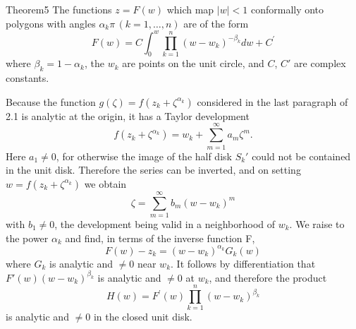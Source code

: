 \begin{originalstatement}{Theorem}{5}\label{thm:6.5}
The functions $z = F(w)$ which map $|w| < 1$ conformally onto polygons with angles $\alpha_k\pi\,(k = 1, \ldots, n)$ are of the form
\begin{equation*}
F (w) = C \int_ {0} ^ {w} \prod_ {k = 1} ^ {n} (w - w _ {k}) ^ {- \beta_ {k}} d w + C ^ {\prime}\tag{3}\label{eq:6.3}
\end{equation*}
where $\beta_{k} = 1 - \alpha_{k}$, the $w_{k}$ are points on the unit circle, and $C$, $C'$ are complex constants.

\end{originalstatement}
Because the function $g(\zeta) = f(z_k + \zeta^{\alpha_k})$ considered in the last paragraph of 2.1 is analytic at the origin, it has a Taylor development
\begin{equation*}
f (z _ {k} + \zeta^ {\alpha_ {k}}) = w _ {k} + \sum_ {m = 1} ^ {\infty} a _ {m} \zeta^ {m}.
\end{equation*}
Here $a_1 \neq 0$, for otherwise the image of the half disk $S_k'$ could not be contained in the unit disk. Therefore the series can be inverted, and on setting $w = f(z_k + \zeta^{\alpha_k})$ we obtain
\begin{equation*}
\zeta = \sum_ {m = 1} ^ {\infty} b _ {m} (w - w _ {k}) ^ {m}
\end{equation*}
with $b_{1} \neq 0$, the development being valid in a neighborhood of $w_{k}$. We raise to the power $\alpha_{k}$ and find, in terms of the inverse function F,
\begin{equation*}
F (w) - z _ {k} = (w - w _ {k}) ^ {\alpha_ {k}} G _ {k} (w)
\end{equation*}
where $G_{k}$ is analytic and $\neq0$ near $w_{k}$. It follows by differentiation that $F'(w)(w-w_{k})^{\beta_{k}}$ is analytic and $\neq0$ at $w_{k}$, and therefore the product
\begin{equation*}
H (w) = F ^ {\prime} (w) \prod_ {k = 1} ^ {n} (w - w _ {k}) ^ {\beta_ {k}}\tag{4}\label{eq:6.4}
\end{equation*}
is analytic and $\neq0$ in the closed unit disk.

